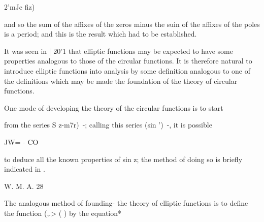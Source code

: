 2'mJc fiz)

and so the sum of the affixes of the zeros minus the suin of the
affixes of the poles is a period; and this is the result which had to
be established.


It was seen in | 20'1 that elliptic functions may be expected to have
some properties analogous to those of the circular functions. It is
therefore natural to introduce elliptic functions into analysis by
some definition analogous to one of the definitions which may be made
the foundation of the theory of circular functions.

One mode of developing the theory of the circular functions is to
start

from the series S z-m7r)~-; calling this series (sin ')~-, it is
possible

JW= - CO

to deduce all the known properties of sin z; the method of doing so
is briefly indicated in .

W. M. A. 28

%
%

The analogous method of founding- the theory of elliptic functions is
to define the function (,.> ( ) by the equation*

